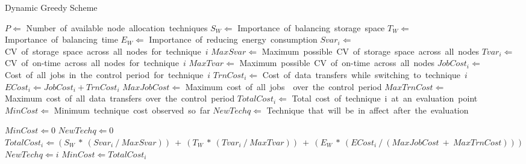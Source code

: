 \documentclass[preprint,12pt]{elsarticle}
\begin{document}
\begin{algorithm}[!htbp]
\caption{Dynamic Greedy Scheme}
\label{greedyapp}
\begin{algorithmic}[1]
    \STATE $P \Leftarrow$ Number\ of\ available\ node\ allocation\ techniques
    \STATE $S_W \Leftarrow$ Importance\ of\ balancing\ storage\ space
    \STATE $T_W \Leftarrow$ Importance\ of\ balancing\ time
    \STATE $E_W \Leftarrow$ Importance\ of\ reducing\ energy\ consumption
    \STATE $Svar_i \Leftarrow$ CV\ of\ storage\ space\ across\ all\ nodes\ for\ technique\ $i$
    \STATE $MaxSvar \Leftarrow$ Maximum\ possible\ CV\ of\ storage\ space\ across\ all\ nodes
    \STATE $Tvar_i \Leftarrow$ CV\ of\ on-time\ across\ all\ nodes\ for\ technique\ $i$
    \STATE $MaxTvar \Leftarrow$ Maximum\ possible\ CV\ of\ on-time\ across\ all\ nodes
    \STATE $JobCost_i \Leftarrow$ Cost\ of\ all\ jobs\ in\ the\ control\ period\ for\ technique\ $i$
    \STATE $TrnCost_i \Leftarrow$ Cost\ of\ data\ transfers\ while\ switching\ to\ technique\ $i$
    \STATE $ECost_i \Leftarrow JobCost_i + TrnCost_i$
    \STATE $MaxJobCost \Leftarrow$ Maximum\ cost\ of\ all\ jobs\ \ over\ the\ control\ period
    \STATE $MaxTrnCost \Leftarrow$ Maximum\ cost\ of\ all\ data\ transfers\ over\ the\ control\ period
    \STATE $TotalCost_i \Leftarrow$ Total\ cost\ of\ technique\ i\ at\ an\ evaluation\ point
    \STATE $MinCost \Leftarrow$ Minimum\ technique\ cost\ observed\ so\ far
    \STATE $NewTechq \Leftarrow$ Technique\ that\ will\ be\ in\ affect\ after\ the\ evaluation

    \STATE $MinCost \Leftarrow 0$
    \STATE $NewTechq \Leftarrow 0$
        \STATE $TotalCost_i \Leftarrow (S_W\ *\ (Svar_i\ /\ MaxSvar))\ +\ (T_W\ *\ (Tvar_i\ /\ MaxTvar))\ +\ (E_W\ *\ (ECost_i\ /\ (MaxJobCost\ +\ MaxTrnCost)))$
            \STATE $NewTechq \Leftarrow i$
            \STATE $MinCost \Leftarrow TotalCost_i$
        \ENDIF
    \ENDFOR
\end{algorithmic}
\end{algorithm}
\end{document}
